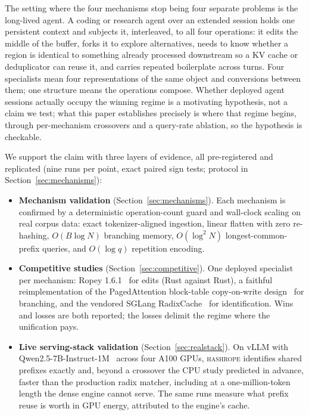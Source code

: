 \documentclass[10pt,conference]{IEEEtran}
\newcommand{\hr}{\textsc{hashrope}}
\begin{document}
The setting where the four mechanisms stop being four separate
problems is the long-lived agent. A coding or research agent over an
extended session holds one persistent context and subjects it,
interleaved, to all four operations: it edits the middle of the
buffer, forks it to explore alternatives, needs to know whether a
region is identical to something already processed downstream so a KV
cache or deduplicator can reuse it, and carries repeated boilerplate
across turns. Four specialists mean four representations of the same
object and conversions between them; one structure means the
operations compose. Whether deployed agent sessions actually occupy
the winning regime is a motivating hypothesis, not a claim we test;
what this paper establishes precisely is where that regime begins,
through per-mechanism crossovers and a query-rate ablation, so the
hypothesis is checkable.

We support the claim with three layers of evidence, all pre-registered
and replicated (nine runs per point, exact paired sign tests; protocol
in Section~\ref{sec:mechanisms}):

\begin{itemize}
\item \textbf{Mechanism validation} (Section~\ref{sec:mechanisms}).
Each mechanism is confirmed by a deterministic operation-count guard
and wall-clock scaling on real corpus data: exact tokenizer-aligned
ingestion, linear flatten with zero re-hashing,
$O(B\log N)$ branching memory, $O(\log^2 N)$ longest-common-prefix
queries, and $O(\log q)$ repetition encoding.
\item \textbf{Competitive studies} (Section~\ref{sec:competitive}).
One deployed specialist per mechanism: Ropey 1.6.1~\cite{ropey} for
edits (Rust against Rust), a faithful reimplementation of the
PagedAttention block-table copy-on-write
design~\cite{kwon2023pagedattention} for branching, and the vendored
SGLang RadixCache~\cite{zheng2024sglang} for identification. Wins and
losses are both reported; the losses delimit the regime where the
unification pays.
\item \textbf{Live serving-stack validation}
(Section~\ref{sec:realstack}). On vLLM with
Qwen2.5-7B-Instruct-1M~\cite{yang2025qwen1m} across four A100 GPUs,
\hr{} identifies shared prefixes exactly and, beyond a crossover the CPU
study predicted in advance, faster than the production radix matcher,
including at a one-million-token length the dense engine cannot serve.
The same runs measure what prefix reuse is worth in GPU energy,
attributed to the engine's cache.
\end{itemize}
\end{document}
